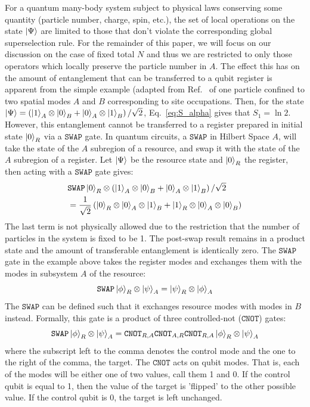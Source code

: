 For a quantum many-body system subject to physical laws conserving some quantity (particle number, charge, spin, etc.), the set of local operations on the state $\ket{\Psi}$ are limited to those that don't violate the corresponding global superselection rule.  For the remainder of this paper, we will focus on our discussion on the case of fixed total $N$ and thus we are restricted to only those operators which locally preserve the particle number in $A$.  The effect this has on the amount of entanglement that can be transferred to a qubit register is apparent from the simple example (adapted from Ref.~\cite{Wiseman:2003vn} of one particle confined to two spatial modes $A$ and $B$ corresponding to site occupations.  Then, for the state $\ket{\Psi} = \left(\ket{1}_A \otimes \ket{0}_{B} + \ket{0}_A \otimes \ket{1}_{B} \right)/\sqrt{2}$, Eq.~\eqref{eq:S_alpha} gives that $S_1 = \ln 2$. However, this entanglement cannot be transferred to a register prepared in initial state $\ket{0}_R$ via a $\texttt{SWAP}$ gate. In quantum circuits, a $\texttt{SWAP}$ in Hilbert Space $A$, will take the state of the $A$ subregion of a resource, and swap it with the state of the $A$ subregion of a register. Let $\ket{\Psi}$ be the resource state and $\ket{0}_R$ the register, then acting with a $\texttt{SWAP}$ gate gives:
%
\begin{align*}
    & \texttt{SWAP} \ket{0}_R\otimes\left(\ket{1}_A \otimes
    \ket{0}_{B} + \ket{0}_A \otimes \ket{1}_{B} \right)/\sqrt{2} \\
    &= \frac{1}{\sqrt{2}}\left( \ket{0}_R \otimes \ket{0}_A \otimes
        \ket{1}_{B} + \ket{1}_R \otimes \ket{0}_A \otimes
    \ket{0}_{B} \right)
\end{align*}
The last term is not physically allowed due to the restriction that the number of particles in the system is fixed to be 1. The post-swap result remains in a product state and the amount of transferable entanglement is identically zero. The $\texttt{SWAP}$ gate in the example above takes the register modes and exchanges them with the modes in subsystem $A$ of the resource:
%
\begin{equation}
\texttt{SWAP} \ket{\phi}_R \otimes \ket{\psi}_A = \ket{\psi}_R \otimes \ket{\phi}_A
\end{equation}
%
The $\texttt{SWAP}$ can be defined such that it exchanges resource modes with modes in $B$ instead. Formally, this gate is a product of three controlled-not ($\texttt{CNOT}$) gates:
%
\begin{equation}
\texttt{SWAP} \ket{\phi}_R \otimes \ket{\psi}_A = \texttt{CNOT}_{R,A} \texttt{CNOT}_{A,R} \texttt{CNOT}_{R,A} \ket{\phi}_R \otimes \ket{\psi}_A
\end{equation}
%
where the subscript left to the comma denotes the control mode and the one to the right of the comma, the target. The $\texttt{CNOT}$ acts on qubit modes. That is, each of the modes will be either one of two values, call them 1 and 0. If the control qubit is equal to 1, then the value of the target is 'flipped' to the other possible value. If the control qubit is 0, the target is left unchanged.

